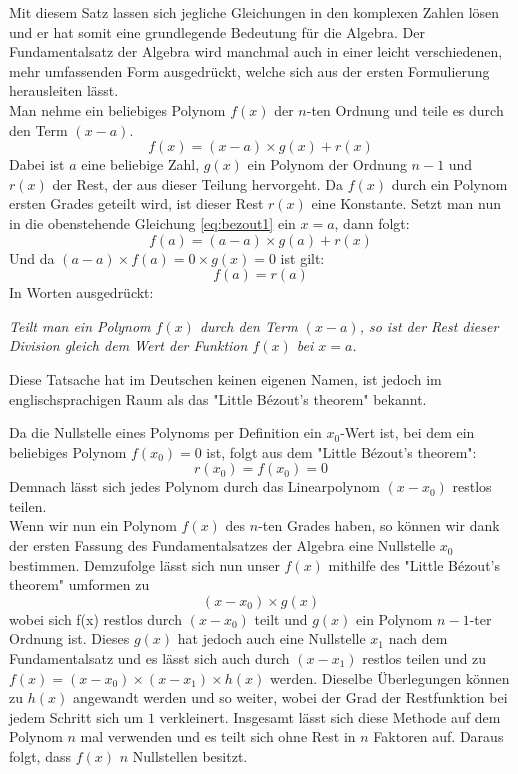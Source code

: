 \documentclass[a4paper,12pt]{article} %
\begin{document}
Mit diesem Satz lassen sich jegliche Gleichungen in den komplexen Zahlen lösen und er hat somit eine grundlegende Bedeutung für die Algebra.
Der Fundamentalsatz der Algebra wird manchmal auch in einer leicht verschiedenen, mehr umfassenden Form ausgedrückt, welche sich aus der ersten Formulierung herausleiten lässt.\\

\noindent Man nehme ein beliebiges Polynom $f(x)$ der $n$-ten Ordnung und teile es durch den Term $(x-a)$.
\begin{equation}\label{eq:bezout1}
f(x) = (x - a) \times g(x) + r(x)
\end{equation} 
Dabei ist $a$ eine beliebige Zahl, $g(x)$ ein Polynom der Ordnung $n-1$ und $r(x)$ der Rest, der aus dieser Teilung hervorgeht.
Da $f(x)$ durch ein Polynom ersten Grades geteilt wird, ist dieser Rest $r(x)$ eine Konstante.
Setzt man nun in die obenstehende Gleichung \eqref{eq:bezout1} ein $x=a$, dann folgt:
\[ f(a) = (a-a) \times g(a) + r(x) \]
Und da $(a - a) \times f(a) = 0 \times g(x) = 0 $ ist gilt:
\[ f(a) = r(a) \]
In Worten ausgedrückt:

\noindent \textit{Teilt man ein Polynom $f(x)$ durch den Term $(x-a)$, so ist der Rest dieser Division gleich dem Wert der Funktion $f(x)$ bei $x=a$.}

\noindent Diese Tatsache hat im Deutschen keinen eigenen Namen, ist jedoch im englischsprachigen Raum als das "Little Bézout's theorem" bekannt.

\noindent Da die Nullstelle eines Polynoms per Definition ein $x_0$-Wert ist, bei dem ein beliebiges Polynom $f(x_0) = 0$ ist, folgt aus dem "Little Bézout's theorem":
\begin{equation}\label{eq:bezout0}
r(x_0) = f(x_0)=0
\end{equation}
Demnach lässt sich jedes Polynom durch das Linearpolynom $(x-x_0)$ restlos teilen.\\

Wenn wir nun ein Polynom $f(x)$ des $n$-ten Grades haben, so können wir dank der ersten Fassung des Fundamentalsatzes der Algebra eine Nullstelle $x_0$ bestimmen. Demzufolge lässt sich nun unser $f(x)$ mithilfe des "Little Bézout's theorem" umformen zu
\[(x-x_0) \times g(x)\]
wobei sich f(x) restlos durch $(x-x_0)$ teilt und $g(x)$ ein Polynom $n-1$-ter Ordnung ist.
Dieses $g(x)$ hat jedoch auch eine Nullstelle $x_1$ nach dem Fundamentalsatz und es lässt sich auch durch $(x-x_1)$ restlos teilen und zu $f(x) = (x-x_0) \times (x-x_1) \times h(x)$ werden. Dieselbe Überlegungen können zu $h(x)$ angewandt werden und so weiter, wobei der Grad der Restfunktion bei jedem Schritt sich um $1$ verkleinert.
Insgesamt lässt sich diese Methode auf dem Polynom $n$ mal verwenden und es teilt sich ohne Rest in $n$ Faktoren auf. Daraus folgt, dass $f(x)$ $n$ Nullstellen besitzt.
\end{document}
